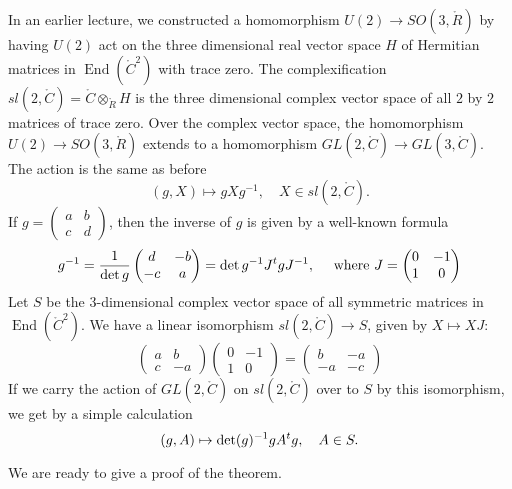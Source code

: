 \documentclass{amsart}
\def\t#1{\hbox{}^t#1}
\def\op#1{{\operatorname{#1}}}
\def\CC{\ring{C}}
\def\RR{\ring{R}}
\begin{document}
In an earlier lecture, we constructed a homomorphism $U(2)\to
SO(3,\RR)$ by having $U(2)$ act on the three dimensional real
vector space $H$ of Hermitian matrices in $\op{End}(\CC^2)$ with
trace zero.  The complexification
$sl(2,\CC)=\CC\otimes_{\RR} H$ is the three dimensional
complex vector space of all $2$ by $2$
matrices of trace zero.  Over the complex vector space, the
homomorphism $U(2)\to SO(3,\RR)$ extends to a homomorphism
$GL(2,\CC)\to GL(3,\CC)$.  The action is the same as before
\[
(g,X)\mapsto g X g^{-1},\quad X\in sl(2,\CC).
\]
If $g = \begin{pmatrix} a& b\\ c & d\end{pmatrix}$, then the inverse
of $g$ is given by a well-known formula
\[
g^{-1} = \frac{1}{\det{g}}\begin{pmatrix} d & - b \\ -c & a\end{pmatrix} 
= \det g^{-1} J \t{g} J^{-1}, \quad
\hbox{ where } J = \begin{pmatrix} 0 & -1 \\ 1 &0 \end{pmatrix}
\]
Let $S$ be the $3$-dimensional complex vector space of all symmetric matrices in $\op{End}(\CC^2)$.
We have a linear isomorphism $sl(2,\CC)\to S$, given by $X\mapsto X J$:
\[
\begin{pmatrix} a& b\\c & -a\end{pmatrix} \begin{pmatrix} 0& -1 \\1 &0\end{pmatrix} = 
\begin{pmatrix} b & -a \\ -a & -c \end{pmatrix}
\]
If we carry the action of $GL(2,\CC)$ on $sl(2,\CC)$
over to $S$ by this isomorphism, we get by a simple calculation
\[
(g,A) \mapsto \det(g)^{-1} g A \t{g},\quad A \in S.
\]

We are ready to give a proof of the theorem.
\end{document}
